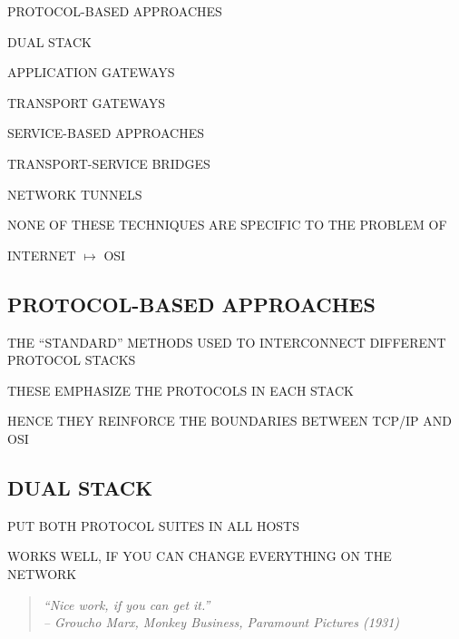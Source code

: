 \begin{bwslide}

\begin{nrtc}
\item	PROTOCOL-BASED APPROACHES
    \begin{nrtc}
    \item	DUAL STACK

    \item	APPLICATION GATEWAYS

    \item	TRANSPORT GATEWAYS
    \end{nrtc}

\item	SERVICE-BASED APPROACHES
    \begin{nrtc}
    \item	TRANSPORT-SERVICE BRIDGES

    \item	NETWORK TUNNELS
    \end{nrtc}

\item	NONE OF THESE TECHNIQUES ARE SPECIFIC TO THE PROBLEM OF
    \begin{nrtc}
    \item	INTERNET $\mapsto$ OSI
    \end{nrtc}
\end{nrtc}
\end{bwslide}


\begin{bwslide}
\part	{PROTOCOL-BASED APPROACHES}\bf

\begin{nrtc}
\item	THE ``STANDARD'' METHODS USED TO INTERCONNECT DIFFERENT
	PROTOCOL STACKS

\item	THESE EMPHASIZE THE PROTOCOLS IN EACH STACK

\item	HENCE THEY REINFORCE THE BOUNDARIES BETWEEN TCP/IP AND OSI
\end{nrtc}
\end{bwslide}


\begin{bwslide}
\part*	{DUAL STACK}\bf

\begin{nrtc}
\item	PUT BOTH PROTOCOL SUITES IN ALL HOSTS

\item	WORKS WELL, IF YOU CAN CHANGE EVERYTHING ON THE NETWORK
\begin{quote}\em
``Nice work, if you can get it.''\\ \raggedleft
-- Groucho Marx, Monkey Business, Paramount Pictures (1931)
\end{quote}
\end{nrtc}
\end{bwslide}


